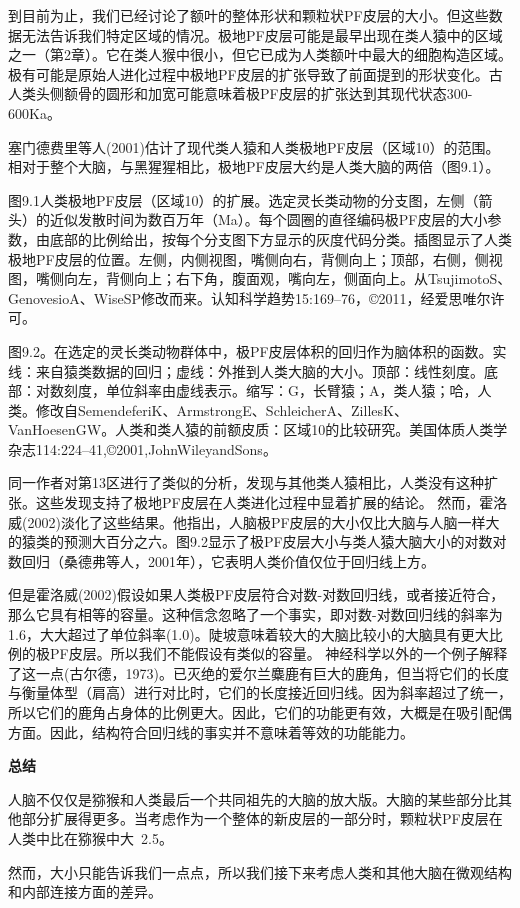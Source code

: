 \par
到目前为止，我们已经讨论了额叶的整体形状和颗粒状PF皮层的大小。但这些数据无法告诉我们特定区域的情况。极地PF皮层可能是最早出现在类人猿中的区域之一（第2章）。它在类人猴中很小，但它已成为人类额叶中最大的细胞构造区域。极有可能是原始人进化过程中极地PF皮层的扩张导致了前面提到的形状变化。古人类头侧额骨的圆形和加宽可能意味着极PF皮层的扩张达到其现代状态300-600Ka。
\par
塞门德费里等人(2001)估计了现代类人猿和人类极地PF皮层（区域10）的范围。相对于整个大脑，与黑猩猩相比，极地PF皮层大约是人类大脑的两倍（图9.1）。
\par
图9.1人类极地PF皮层（区域10）的扩展。选定灵长类动物的分支图，左侧（箭头）的近似发散时间为数百万年（Ma）。每个圆圈的直径编码极PF皮层的大小参数，由底部的比例给出，按每个分支图下方显示的灰度代码分类。插图显示了人类极地PF皮层的位置。左侧，内侧视图，嘴侧向右，背侧向上；顶部，右侧，侧视图，嘴侧向左，背侧向上；右下角，腹面观，嘴向左，侧面向上。从TsujimotoS、GenovesioA、WiseSP修改而来。认知科学趋势15:169–76，©2011，经爱思唯尔许可。
\par
图9.2。在选定的灵长类动物群体中，极PF皮层体积的回归作为脑体积的函数。实线：来自猿类数据的回归；虚线：外推到人类大脑的大小。顶部：线性刻度。底部：对数刻度，单位斜率由虚线表示。缩写：G，长臂猿；A，类人猿；哈，人类。修改自SemendeferiK、ArmstrongE、SchleicherA、ZillesK、VanHoesenGW。人类和类人猿的前额皮质：区域10的比较研究。美国体质人类学杂志114:224–41,©2001,JohnWileyandSons。
\par
同一作者对第13区进行了类似的分析，发现与其他类人猿相比，人类没有这种扩张。这些发现支持了极地PF皮层在人类进化过程中显着扩展的结论。
然而，霍洛威(2002)淡化了这些结果。他指出，人脑极PF皮层的大小仅比大脑与人脑一样大的猿类的预测大百分之六。图9.2显示了极PF皮层大小与类人猿大脑大小的对数对数回归（桑德弗等人，2001年），它表明人类价值仅位于回归线上方。
\par
但是霍洛威(2002)假设如果人类极PF皮层符合对数-对数回归线，或者接近符合，那么它具有相等的容量。这种信念忽略了一个事实，即对数-对数回归线的斜率为1.6，大大超过了单位斜率(1.0)。陡坡意味着较大的大脑比较小的大脑具有更大比例的极PF皮层。所以我们不能假设有类似的容量。
神经科学以外的一个例子解释了这一点(古尔德，1973)。已灭绝的爱尔兰麋鹿有巨大的鹿角，但当将它们的长度与衡量体型（肩高）进行对比时，它们的长度接近回归线。因为斜率超过了统一，所以它们的鹿角占身体的比例更大。因此，它们的功能更有效，大概是在吸引配偶方面。因此，结构符合回归线的事实并不意味着等效的功能能力。
\par
\textbf{总结}
\par
人脑不仅仅是猕猴和人类最后一个共同祖先的大脑的放大版。大脑的某些部分比其他部分扩展得更多。当考虑作为一个整体的新皮层的一部分时，颗粒状PF皮层在人类中比在猕猴中大~2.5。
\par
然而，大小只能告诉我们一点点，所以我们接下来考虑人类和其他大脑在微观结构和内部连接方面的差异。
